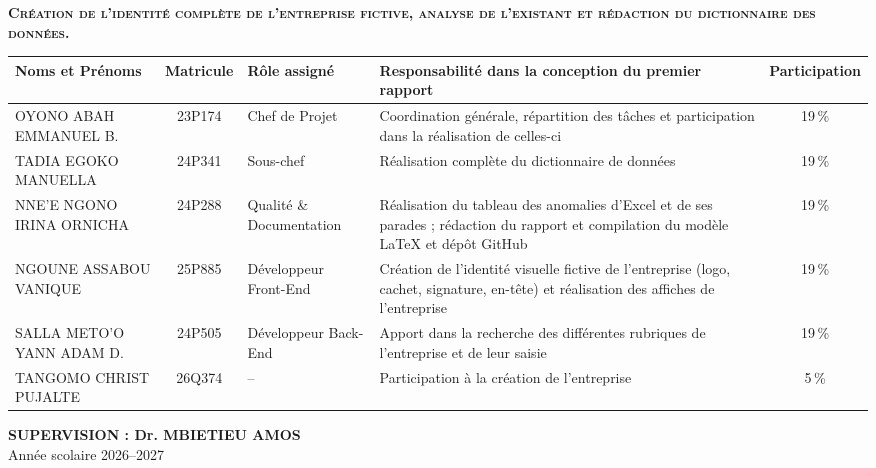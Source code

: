 \documentclass[12pt,a4paper]{article}
\begin{document}
\vspace{1.5cm}

{\Large\bfseries\scshape\color{navy} Création de l'identité complète de l'entreprise fictive, analyse de l'existant et rédaction du dictionnaire des données.}

\vfill

\begin{center}
\renewcommand{\arraystretch}{1.3}
\small
\begin{tabular}{|>{\raggedright\arraybackslash}p{3cm}|c|>{\raggedright\arraybackslash}p{2.6cm}|>{\raggedright\arraybackslash}p{5.6cm}|c|}
\hline
\textbf{Noms et Prénoms} & \textbf{Matricule} & \textbf{Rôle assigné} & \textbf{Responsabilité dans la conception du premier rapport} & \textbf{Participation}\\\hline
OYONO ABAH EMMANUEL B. & 23P174 & Chef de Projet & Coordination générale, répartition des tâches et participation dans la réalisation de celles-ci & 19\,\%\\\hline
TADIA EGOKO MANUELLA & 24P341 & Sous-chef & Réalisation complète du dictionnaire de données & 19\,\%\\\hline
NNE'E NGONO IRINA ORNICHA & 24P288 & Qualité \& Documentation & Réalisation du tableau des anomalies d'Excel et de ses parades ; rédaction du rapport et compilation du modèle \LaTeX{} et dépôt GitHub & 19\,\%\\\hline
NGOUNE ASSABOU VANIQUE & 25P885 & Développeur Front-End & Création de l'identité visuelle fictive de l'entreprise (logo, cachet, signature, en-tête) et réalisation des affiches de l'entreprise & 19\,\%\\\hline
SALLA METO'O YANN ADAM D. & 24P505 & Développeur Back-End & Apport dans la recherche des différentes rubriques de l'entreprise et de leur saisie & 19\,\%\\\hline
TANGOMO CHRIST PUJALTE & 26Q374 & -- & Participation à la création de l'entreprise & 5\,\%\\\hline
\end{tabular}
\end{center}

\vspace{0.6cm}
\begin{center}
\textbf{SUPERVISION : Dr. MBIETIEU AMOS}\\[4pt]
Année scolaire 2026--2027
\end{center}

\newpage
\end{document}
